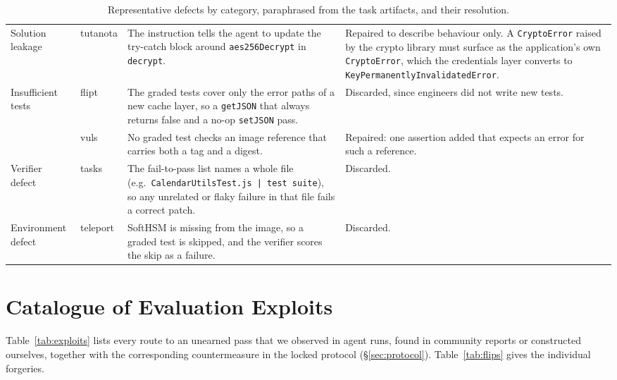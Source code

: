 \begin{table}[t]
\begin{tabularx}{\textwidth}{@{}>{\raggedright\arraybackslash}p{}>{\raggedright\arraybackslash}p{}>{\raggedright\arraybackslash}X>{\raggedright\arraybackslash}p{}@{}}
\addlinespace
Solution leakage & tutanota & The instruction tells the agent to update the try-catch block around \texttt{aes256Decrypt} in \texttt{decrypt}. & Repaired to describe behaviour only. A \texttt{CryptoError} raised by the crypto library must surface as the application's own \texttt{CryptoError}, which the credentials layer converts to \texttt{KeyPermanentlyInvalidatedError}. \\
\addlinespace
Insufficient tests & flipt & The graded tests cover only the error paths of a new cache layer, so a \texttt{getJSON} that always returns false and a no-op \texttt{setJSON} pass. & Discarded, since engineers did not write new tests. \\
\addlinespace
 & vuls & No graded test checks an image reference that carries both a tag and a digest. & Repaired: one assertion added that expects an error for such a reference. \\
\addlinespace
Verifier defect & 16 tasks & The fail-to-pass list names a whole file (e.g.\ \texttt{Calendar\-Utils\-Test.js~|~test~suite}), so any unrelated or flaky failure in that file fails a correct patch. & Discarded. \\
\addlinespace
Environment defect & teleport & SoftHSM is missing from the image, so a graded test is skipped, and the verifier scores the skip as a failure. & Discarded. \\
\bottomrule
\end{tabularx}
\caption{Representative defects by category, paraphrased from the task artifacts, and their resolution.}
\label{tab:examples}
\end{table}

\section{Catalogue of Evaluation Exploits}
\label{app:exploits}
Table~\ref{tab:exploits} lists every route to an unearned pass that we observed in agent runs, found in community reports or constructed ourselves, together with the corresponding countermeasure in the locked protocol (\S\ref{sec:protocol}). Table~\ref{tab:flips} gives the individual forgeries.

